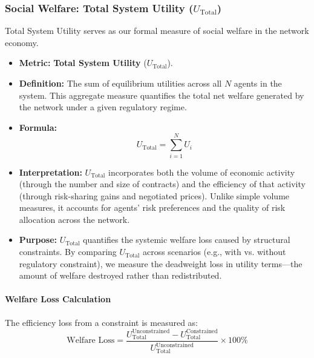 \subsubsection{Social Welfare: Total System Utility ($U_{\text{Total}}$)}

Total System Utility serves as our formal measure of social welfare in the network economy.

\begin{itemize}
    \item \textbf{Metric:} \textbf{Total System Utility} ($U_{\text{Total}}$).
    
    \item \textbf{Definition:} The sum of equilibrium utilities across all $N$ agents in the system. This aggregate measure quantifies the total net welfare generated by the network under a given regulatory regime.
    
    \item \textbf{Formula:}
    \begin{equation}
    U_{\text{Total}} = \sum_{i=1}^N U_i
    \label{eq:total_utility}
    \end{equation}
    
    \item \textbf{Interpretation:} $U_{\text{Total}}$ incorporates both the volume of economic activity (through the number and size of contracts) and the efficiency of that activity (through risk-sharing gains and negotiated prices). Unlike simple volume measures, it accounts for agents' risk preferences and the quality of risk allocation across the network.
    
    \item \textbf{Purpose:} $U_{\text{Total}}$ quantifies the systemic welfare loss caused by structural constraints. By comparing $U_{\text{Total}}$ across scenarios (e.g., with vs. without regulatory constraint), we measure the deadweight loss in utility terms---the amount of welfare destroyed rather than redistributed. 
\end{itemize}

\paragraph{Welfare Loss Calculation}

The efficiency loss from a constraint is measured as:
\begin{equation}
\text{Welfare Loss} = \frac{U_{\text{Total}}^{\text{Unconstrained}} - U_{\text{Total}}^{\text{Constrained}}}{U_{\text{Total}}^{\text{Unconstrained}}} \times 100\%
\end{equation}

